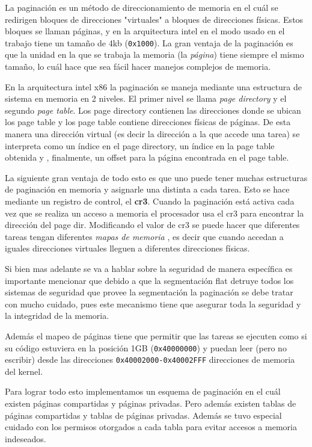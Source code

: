 	La paginación es un método de direccionamiento de memoria
en el cuál se redirigen bloques de direcciones "virtuales"
a bloques de direcciones físicas. Estos bloques se llaman páginas, y
en la arquitectura intel en el modo usado en el trabajo tiene
un tamaño de 4kb (\texttt{0x1000}). La gran ventaja de la paginación
es que la unidad en la que se trabaja la memoria (la \textit{página})
tiene siempre el mismo tamaño, lo cuál hace que sea fácil hacer manejos
complejos de memoria.

	En la arquitectura intel x86 la paginación se maneja mediante
una estructura de sistema en memoria en 2 niveles. El primer nivel se llama
\textit{page directory} y el segundo \textit{page table}. Los page directory
contienen las direcciones donde se ubican los page table y los page
table contiene direcciones físicas de páginas. De esta manera una dirección
virtual (es decir la dirección a la que accede una tarea) se interpreta
como un índice en el page directory, un índice en la page table obtenida y
, finalmente, un offset para la página encontrada en el page table.

	La siguiente gran ventaja de todo esto es que uno puede tener muchas
estructuras de paginación en memoria y asignarle una distinta a cada tarea.
Esto se hace mediante un registro de control, el \textbf{cr3}. Cuando la
paginación está activa cada vez que se realiza un acceso a memoria
el procesador usa el cr3 para encontrar la dirección del page dir. Modificando
el valor de cr3 se puede hacer que diferentes tareas tengan diferentes \textit{mapas de memoria}
, es decir que cuando accedan a iguales direcciones virtuales lleguen a
diferentes direcciones físicas.

	Si bien mas adelante se va a hablar sobre la seguridad
de manera específica es importante mencionar que debido a que la
segmentación flat detruye todos los sistemas de seguridad que provee
la segmentación la paginación se debe tratar con mucho cuidado, pues
este mecanismo tiene que asegurar toda la seguridad y la integridad de la memoria.

	Además el mapeo de páginas tiene que permitir que las tareas
se ejecuten como si su código estuviera en la posición 1GB (\texttt{0x40000000})
y puedan leer (pero no escribir) desde las direcciones \texttt{0x40002000-0x40002FFF}
direcciones de memoria del kernel.

	Para lograr todo esto implementamos un esquema de paginación en el cuál
existen páginas compartidas y páginas privadas. Pero además existen tablas
de páginas compartidas y tablas de páginas privadas. Además se tuvo especial
cuidado con los permisos otorgados a cada tabla para evitar accesos a memoria
indeseados.


